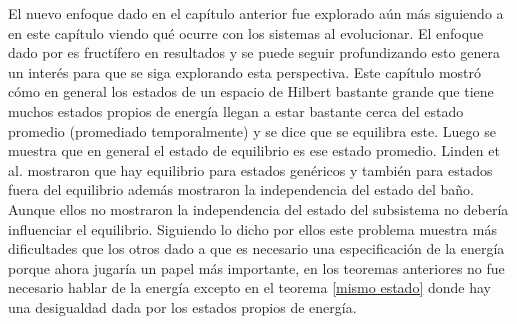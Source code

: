 El nuevo enfoque dado en el capítulo anterior fue explorado aún más siguiendo a \cite{LindenPaper} en este capítulo viendo qué ocurre con los sistemas al evolucionar. El enfoque dado por \cite{Popescu2006} es fructífero  en resultados y se puede seguir profundizando esto genera un interés para que se siga explorando esta perspectiva. Este capítulo mostró cómo en general los estados de un espacio de Hilbert bastante grande que tiene muchos estados propios de energía llegan a estar bastante cerca del estado promedio (promediado temporalmente) y se dice que se equilibra este. Luego se muestra que en general el estado de equilibrio es ese estado promedio. Linden et al. mostraron que hay equilibrio para estados genéricos y también para estados fuera del equilibrio además mostraron la independencia del estado del baño. Aunque ellos no mostraron la independencia del estado del subsistema no debería influenciar el equilibrio. Siguiendo lo dicho por ellos este problema muestra más dificultades que los otros dado a que es necesario una especificación de la energía porque ahora jugaría un papel más importante, en los teoremas anteriores no fue necesario hablar de la energía excepto en el teorema \ref{mismo estado} donde hay una desigualdad dada por los estados propios de energía.


